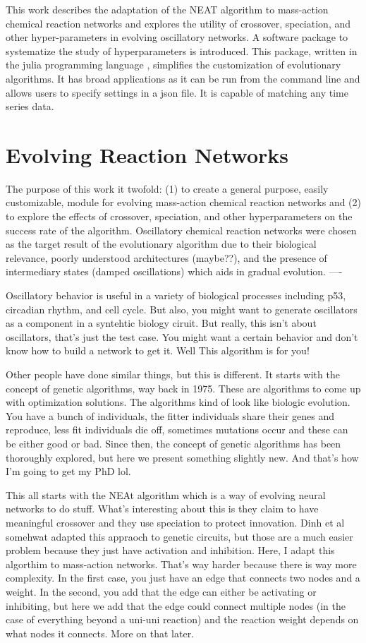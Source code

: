 \documentclass[12pt]{report}
\begin{document}
This work describes the adaptation of the NEAT algorithm to mass-action chemical reaction networks and explores the utility of crossover, speciation, and other hyper-parameters in evolving oscillatory networks. A software package to systematize the study of hyperparameters is introduced. This package, written in the julia programming language \cite{bezanson2017julia}, simplifies the customization of evolutionary algorithms. It has broad applications as it can be run from the command line and allows users to specify settings in a json file. It is capable of matching any time series data. 


\section{Evolving Reaction Networks}
The purpose of this work it twofold: (1) to create a general purpose, easily customizable, module for evolving mass-action chemical reaction networks and (2) to explore the effects of crossover,  speciation, and other hyperparameters on the success rate of the algorithm. Oscillatory chemical reaction networks were chosen as the target result of the evolutionary algorithm due to their biological relevance, poorly understood architectures (maybe??), and the presence of intermediary states (damped oscillations) which aids in gradual evolution.
----

Oscillatory behavior is useful in a variety of biological processes including p53, circadian rhythm, and cell cycle. But also, you might want to generate oscillators as a component in a syntehtic biology ciruit. But really, this isn't about oscillators, that's just the test case. You might want a certain behavior and don't know how to build a  network to get it. Well This algorithm is for you! 

Other people have done similar things, but this is different. It starts with the concept of genetic algorithms, way back in 1975. These are algorithms to come up with optimization solutions. The algorithms kind of look like biologic evolution. You have a bunch of individuals, the fitter individuals share their genes and reproduce, less fit individuals die off, sometimes mutations occur and these can be either good or bad. Since then, the concept of genetic algorithms has been thoroughly explored, but here we present something slightly new. And that's how I'm going to get my PhD lol.

This all starts with the NEAt algorithm which is a way of evolving neural networks to do stuff.  What's interesting about this is they claim to have meaningful crossover and they use speciation to protect innovation. Dinh et al somehwat adapted this appraoch to genetic circuits, but those are a much easier problem because they just have activation and inhibition. Here, I adapt this algorthim to mass-action networks. That's way harder because there is way more complexity. In the first case, you just have an edge that connects two nodes and a weight. In the second, you add that the edge can either be activating or inhibiting, but here we add that the edge could connect multiple nodes (in the case of everything beyond a uni-uni reaction) and the reaction weight depends on what nodes it connects. More on that later.
\end{document}
